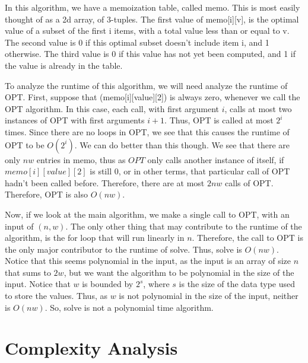 \documentclass{article}
\begin{document}
In this algorithm, we have a memoization table, called memo.  This is most easily thought of as a 2d array, of 3-tuples.  The first value of memo[i][v], is the optimal value of a subset of the first i items, with a total value less than or equal to v.  The second value is 0 if this optimal subset doesn't include item i, and 1 otherwise.  The third value is 0 if this value has not yet been computed, and 1 if the value is already in the table.

To analyze the runtime of this algorithm, we will need analyze the runtime of OPT.  First, suppose that (memo[i][value][2]) is always zero, whenever we call the OPT algorithm.  In this case, each call, with first argument $i$, calls at most two instances of OPT with first arguments $i+1$.  Thus, OPT is called at most $2^i$ times.  Since there are no loops in OPT, we see that this causes the runtime of OPT to be $O(2^i)$.  We can do better than this though.  We see that there are only $nw$ entries in memo, thus as $OPT$ only calls another instance of itself, if $memo[i][value][2]$ is still 0, or in other terms, that particular call of OPT hadn't been called before.  Therefore, there are at most $2nw$ calls of OPT.  Therefore, OPT is also $O(nw)$.

Now, if we look at the main algorithm, we make a single call to OPT, with an input of $(n,w)$.  The only other thing that may contribute to the runtime of the algorithm, is the for loop that will run linearly in $n$.  Therefore, the call to OPT is the only major contributor to the runtime of solve.  Thus, solve is $O(nw)$.  Notice that this seems polynomial in the input, as the input is an array of size $n$ that sums to $2w$, but we want the algorithm to be polynomial in the size of the input.  Notice that $w$ is bounded by $2^s$, where $s$ is the size of the data type used to store the values.  Thus, as $w$ is not polynomial in the size of the input, neither is $O(nw)$.  So, solve is not a polynomial time algorithm.


\section{Complexity Analysis}
\end{document}
